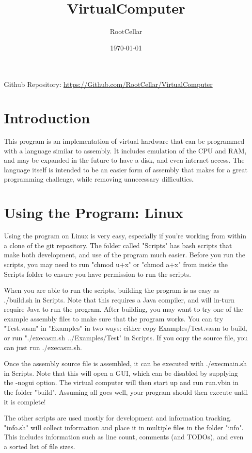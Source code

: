 \documentclass[12pt]{article}
\title{\bfseries VirtualComputer}
\author{RootCellar}
\date{\today}
\begin{document}
\maketitle

Github Repository: \url{https://Github.com/RootCellar/VirtualComputer}

\section{Introduction}

This program is an implementation of virtual hardware that can be programmed with a language similar to assembly.
It includes emulation of the CPU and RAM, and may be expanded in the future to have a disk, and even internet access.
The language itself is intended to be an easier form of assembly that makes for a great programming challenge, while
removing unnecessary difficulties.

\section{Using the Program: Linux}

Using the program on Linux is very easy, especially if you're working from within a clone of the git repository.
The folder called "Scripts" has bash scripts that make both development, and use of the program much easier.
Before you run the scripts, you may need to run "chmod u+x" or "chmod a+x" from inside the Scripts folder to
ensure you have permission to run the scripts.

When you are able to run the scripts, building the program is as easy as ./build.sh in Scripts. Note that this requires a Java compiler,
and will in-turn require Java to run the program. After building, you may want to try one of the example assembly
files to make sure that the program works. You can try "Test.vasm" in "Examples" in two ways: either copy Examples/Test.vasm to build, or
run "./execasm.sh ../Examples/Test" in Scripts. If you copy the source file, you can just run ./execasm.sh.

Once the assembly source file is assembled, it can be executed with ./execmain.sh in Scripts. Note that this will open a GUI,
which can be disabled by supplying the -nogui option. The virtual computer will then start up and run run.vbin in the folder "build".
Assuming all goes well, your program should then execute until it is complete!

The other scripts are used mostly for development and information tracking. "info.sh" will collect information and place it
in multiple files in the folder "info". This includes information such as line count, comments (and TODOs), and even a sorted list of file sizes.
\end{document}
